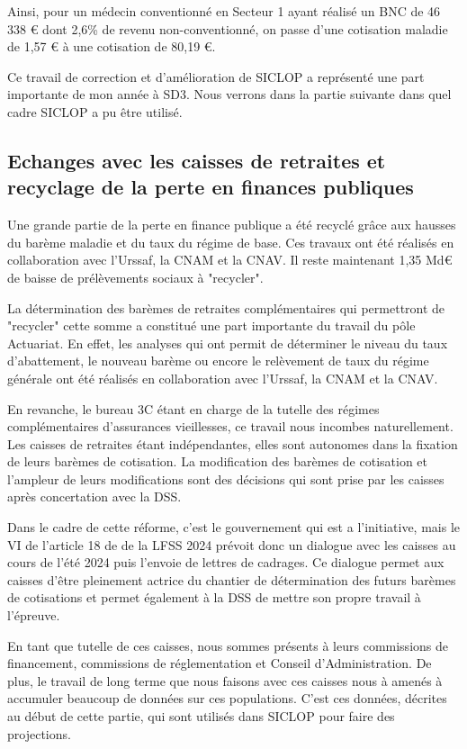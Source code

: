 Ainsi, pour un médecin conventionné en Secteur 1 ayant réalisé un BNC de 46 338 € dont 2,6\% de revenu non-conventionné, on passe d'une cotisation maladie de 1,57 € à une cotisation de 80,19 €.

Ce travail de correction et d'amélioration de SICLOP a représenté une part importante de mon année à SD3. Nous verrons dans la partie suivante dans quel cadre SICLOP a pu être utilisé.


\subsection{Echanges avec les caisses de retraites et recyclage de la perte en finances publiques}

Une grande partie de la perte en finance publique a été recyclé grâce aux hausses du barème maladie et du taux du régime de base. Ces travaux ont été réalisés en collaboration avec l’Urssaf, la
CNAM et la CNAV. Il reste maintenant 1,35 Md€ de baisse de prélèvements sociaux à "recycler".

La détermination des barèmes de retraites complémentaires qui permettront de "recycler" cette somme a constitué une part importante du travail du pôle Actuariat. En effet, les analyses qui ont permit de déterminer le niveau du taux d'abattement, le nouveau barème ou encore le relèvement de taux du régime générale ont été réalisés en collaboration avec l'Urssaf, la CNAM et la CNAV.

En revanche, le bureau 3C étant en charge de la tutelle des régimes complémentaires d'assurances vieillesses, ce travail nous incombes naturellement. Les caisses de retraites étant indépendantes, elles sont autonomes dans la fixation de leurs barèmes de cotisation. La modification des barèmes de cotisation et l'ampleur de leurs modifications sont des décisions qui sont prise par les caisses après concertation avec la DSS.

Dans le cadre de cette réforme, c'est le gouvernement qui est a l'initiative, mais le VI de l’article 18 de de la LFSS 2024 prévoit donc un dialogue avec les caisses au cours de l'été 2024 puis l'envoie de lettres de cadrages. Ce dialogue permet  aux caisses d'être pleinement actrice du chantier de détermination des futurs barèmes de cotisations et permet également à la DSS de mettre son propre travail à l'épreuve.

En tant que tutelle de ces caisses, nous sommes présents à leurs commissions de financement, commissions de réglementation et Conseil d'Administration. De plus, le travail de long terme que nous faisons avec ces caisses nous à amenés à accumuler beaucoup de  données sur ces populations. C'est ces données, décrites au début de cette partie, qui sont utilisés dans SICLOP pour faire des projections.

